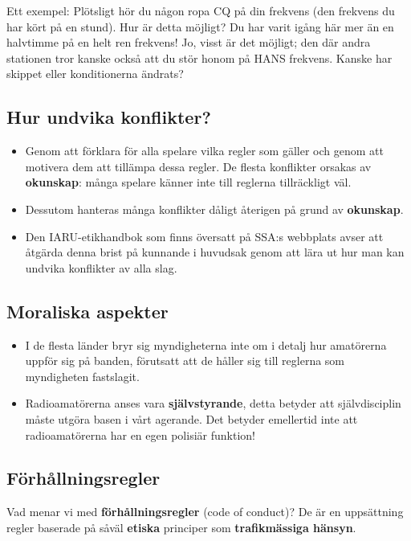 Ett exempel: Plötsligt hör du någon ropa CQ på din frekvens (den frekvens du
har kört på en stund).
Hur är detta möjligt?
Du har varit igång här mer än en halvtimme på en helt ren frekvens!
Jo, visst är det möjligt; den där andra stationen tror kanske också att du stör
honom på HANS frekvens.
Kanske har skippet eller konditionerna ändrats?

\subsection{Hur undvika konflikter?}
\begin{itemize}
\item Genom att förklara för alla spelare vilka regler som gäller och genom
  att motivera dem att tillämpa dessa regler.
  De flesta konflikter orsakas av \textbf{okunskap}:
  många spelare känner inte till reglerna tillräckligt väl.

\item Dessutom hanteras många konflikter dåligt återigen på grund av
  \textbf{okunskap}.

\item Den IARU-etikhandbok som finns översatt på SSA:s webbplats avser att
  åtgärda denna brist på kunnande i huvudsak genom att lära ut hur man kan
  undvika konflikter av alla slag.
\end{itemize}

\subsection{Moraliska aspekter}
\begin{itemize}
\item I de flesta länder bryr sig myndigheterna inte om i detalj hur
  amatörerna uppför sig på banden, förutsatt att de håller sig till reglerna
  som myndigheten fastslagit.
\item Radioamatörerna anses vara \textbf{självstyrande}, detta betyder att
  självdisciplin måste utgöra basen i vårt agerande. Det betyder emellertid
  inte att radioamatörerna har en egen polisiär funktion!
\end{itemize}

\subsection{Förhållningsregler}

Vad menar vi med \textbf{förhållningsregler} (code of conduct)?
De är en uppsättning regler baserade på såväl \textbf{etiska} principer som
\textbf{trafikmässiga hänsyn}.

